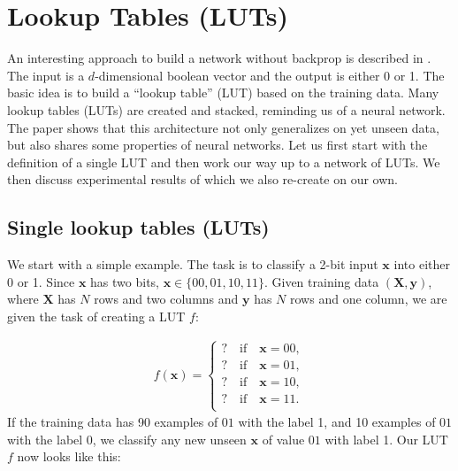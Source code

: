 \section{Lookup Tables (LUTs)}
An interesting approach to build a network without backprop is described in \cite{bib:chatterjee2018learning}. The input is a $d$-dimensional boolean vector and the output is either 0 or 1. The basic idea is to build a \enquote{lookup table} (LUT) based on the training data. Many lookup tables (LUTs) are created and stacked, reminding us of a neural network. The paper shows that this architecture not only generalizes on yet unseen data, but also shares some properties of neural networks. Let us first start with the definition of a single LUT and then work our way up to a network of LUTs. We then discuss experimental results of \cite{bib:chatterjee2018learning} which we also re-create on our own.

\subsection{Single lookup tables (LUTs)}
We start with a simple example. The task is to classify a 2-bit input $\bm{x}$ into either 0 or 1. Since $\bm{x}$ has two bits, $\bm{x} \in \{00, 01, 10, 11 \}$. Given training data $(\bm{X}, \bm{y})$, where $\bm{X}$ has $N$ rows and two columns and $\bm{y}$ has $N$ rows and one column, we are given the task of creating a LUT $f$:

\begin{align}
    f(\bm{x}) = \begin{cases}
        ? \quad \text{if} \quad \bm{x} = 00, \\
        ? \quad \text{if} \quad \bm{x} = 01, \\
        ? \quad \text{if} \quad \bm{x} = 10, \\
        ? \quad \text{if} \quad \bm{x} = 11. \\
    \end{cases}
\end{align} If the training data has 90 examples of $01$ with the label 1, and 10 examples of $01$ with the label 0, we classify any new unseen $\bm{x}$ of value $01$ with label 1. Our LUT $f$ now looks like this:

